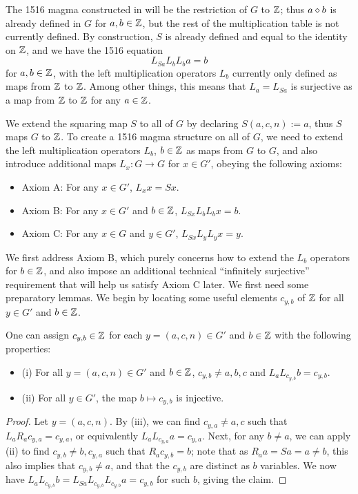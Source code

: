 The 1516 magma constructed in  will be the restriction of $G$ to $\mathbb{Z}$; thus $a \diamond b$ is already defined in $G$ for $a,b \in \mathbb{Z}$, but the rest of the multiplication table is not currently defined.  By construction, $S$ is already defined and equal to the identity on $\mathbb{Z}$, and we have the 1516 equation
$$ L_{Sa} L_b L_b a = b$$
for $a,b \in \mathbb{Z}$, with the left multiplication operators $L_b$ currently only defined as maps from $\mathbb{Z}$ to $\mathbb{Z}$.  Among other things, this means that $L_a = L_{Sa}$ is surjective as a map from $\mathbb{Z}$ to $\mathbb{Z}$ for any $a \in \mathbb{Z}$.

We extend the squaring map $S$ to all of $G$ by declaring $S(a,c,n) := a$, thus $S$ maps $G$ to $\mathbb{Z}$.  To create a 1516 magma structure on all of $G$, we need to extend the left multiplication operators $L_b$, $b \in \mathbb{Z}$ as maps from $G$ to $G$, and also introduce additional maps $L_x: G \to G$ for $x \in G'$, obeying the following axioms:

\begin{itemize}
\item Axiom A: For any $x \in G'$, $L_x x = Sx$.
\item Axiom B: For any $x \in G'$ and $b \in \mathbb{Z}$, $L_{Sx} L_b L_b x = b$.
\item Axiom C: For any $x \in G$ and $y \in G'$, $L_{Sx} L_y L_y x = y$.
\end{itemize}

We first address Axiom B, which purely concerns how to extend the $L_b$ operators for $b \in \mathbb{Z}$, and also impose an additional technical ``infinitely surjective'' requirement that will help us satisfy Axiom C later.  We first need some preparatory lemmas.  We begin by locating some useful elements $c_{y,b}$ of $\mathbb{Z}$ for all $y \in G'$ and $b \in \mathbb{Z}$.

\begin{lemma}\label{aux}  One can assign $c_{y,b} \in \mathbb{Z}$ for each $y = (a,c,n) \in G'$ and $b \in \mathbb{Z}$ with the following properties:
\begin{itemize}
\item (i)  For all $y = (a,c,n) \in G'$ and $b \in \mathbb{Z}$, $c_{y,b} \neq a,b,c$ and $L_a L_{c_{y,b}} b = c_{y,b}$.
\item (ii) For all $y \in G'$, the map $b \mapsto c_{y,b}$ is injective.
\end{itemize}

\end{lemma}

\begin{proof}  Let $y = (a,c,n)$.  By  (iii), we can find $c_{y,a} \neq a,c$ such that $L_a R_a c_{y,a} = c_{y,a}$, or equivalently $L_a L_{c_{y,a}} a = c_{y,a}$.  Next, for any $b \neq a$, we can apply  (ii) to find $c_{y,b} \neq b, c_{y,a}$ such that $R_a c_{y,b} = b$; note that as $R_a a = Sa = a \neq b$, this also implies that $c_{y,b} \neq a$, and that the $c_{y,b}$ are distinct as $b$ variables.  We now have $L_a L_{c_{y,b}} b = L_{Sa} L_{c_{y,b}} L_{c_{y,b}} a = c_{y,b}$ for such $b$, giving the claim.
\end{proof}

